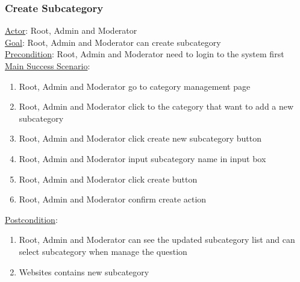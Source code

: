\documentclass[12pt,oneside,openright,a4paper]{cpe-english-project}
\begin{document}
	\subsubsection{Create Subcategory}
	\underline{Actor}: Root, Admin and Moderator\\
	\underline{Goal}: Root, Admin and Moderator can create subcategory\\
	\underline{Precondition}: Root, Admin and Moderator need to login to the system first\\
	\underline{Main Success Scenario}:
	\begin{enumerate}[label={\arabic*.}]
		\item Root, Admin and Moderator go to category management page
		\item Root, Admin and Moderator click to the category that want to add a new subcategory
		\item Root, Admin and Moderator click create new subcategory button
		\item Root, Admin and Moderator input subcategory name in input box
		\item Root, Admin and Moderator click create button
		\item Root, Admin and Moderator confirm create action
	\end{enumerate}
	\underline{Postcondition}: 
	\begin{enumerate}[label={\arabic*.}]
		\item Root, Admin and Moderator can see the updated subcategory list and can select subcategory when manage the question
		\item Websites contains new subcategory
	\end{enumerate}
\end{document}
